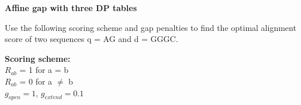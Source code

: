 \question \textbf{Affine gap with three DP tables}
  
Use the following scoring scheme and gap penalties to find the optimal alignment score of two sequences q = AG and d = GGGC.

\medskip 

\textbf{Scoring scheme: }\\
\null \quad $R_{ab}$ = 1 for a = b \\ 
\null \quad $R_{ab}$ = 0 for a $\neq$ b \\ 
\null \quad $g_{open} = 1$, $g_{extend} = 0.1 $ 

\vspace{0.1 in}
\newpage

